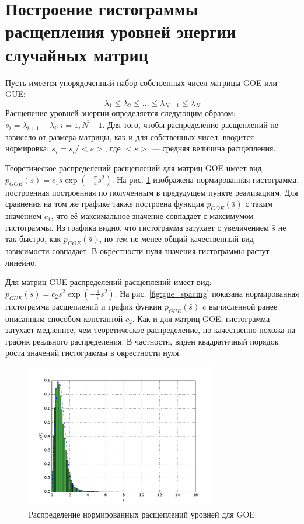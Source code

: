 \documentclass[a4paper]{article}
\begin{document}
\section{Построение гистограммы расщепления уровней энергии случайных матриц}
Пусть имеется упорядоченный набор собственных чисел матрицы GOE или GUE:
\begin{displaymath}
\lambda_1 \leqslant \lambda_2 \leqslant \dots \leqslant \lambda_{N-1} \leqslant \lambda_N
\end{displaymath}
Расщепение уровней энергии определяется следующим образом:
\(s_i = \lambda_{i+1}-\lambda_i, i=\overline{1,N-1}\). Для того, чтобы распределение
расщеплений не зависело от размера матрицы, как и для собственных чисел, вводится
нормировка: \(\bar{s_i}=s_i/<s>\), где \(<s>\) --- средняя величина расщепления.

Теоретическое распределений расщеплений для матриц GOE имеет вид:
\(p_{GOE}(\bar{s}) = c_1 \bar{s} \exp(-\frac{\pi}{4}\bar{s}^2)\). На рис. \ref{fig:goe_spacing}
изображена нормированная гистограмма, построенная построенная по полученным в предудущем пункте
реализациям. Для сравнения на том же графике также построена функция \(p_{GOE}(\bar{s})\)
с таким значением \(c_1\), что её максимальное значение совпадает с максимумом гистограммы.
Из графика видно, что гистограмма затухает с увеличением \(\bar{s}\) не так быстро,
как \(p_{GOE}(\bar{s})\), но тем не менее общий качественный вид зависимости совпадает.
В окрестности нуля значения гистограммы растут линейно.

Для матриц GUE распределений расщеплений имеет вид:
\(p_{GUE}(\bar{s}) = c_2 \bar{s}^2 \exp(-\frac{4}{\pi}\bar{s}^2)\). На рис. \ref{fig:gue_spacing}
показана нормированная гистограмма расщеплений и график функии \(p_{GUE}(\bar{s})\) c
вычисленной ранее описанным способом константой \(c_2\). Как и для матриц GOE,
гистограмма затухает медленнее, чем теоретическое распределение, но качественно
похожа на график реального распределения. В частности, виден квадратичный порядок
роста значений гистограммы в окрестности нуля.

\begin{figure}[H]
	\center
	\includegraphics[width=0.75\textwidth]{../pictures/lab4_goe_spacing_hist.pdf}
	\caption{Распределение нормированных расщеплений уровней для GOE}
	\label{fig:goe_spacing}
\end{figure}
\end{document}
